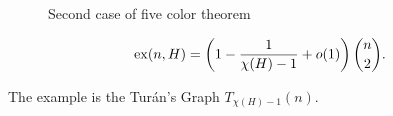 \begin{figure}[ht]
    \centering
    \caption{Second case of five color theorem}
    \label{fig:second-case-five-color-theorem}
\end{figure}

\begin{thm}
	\[
		\operatorname{ex}(n, H) = \left(1 - \frac{1}{\chi(H) - 1} + o(1)\right)\binom{n}{2}.
	\]
\end{thm}

\begin{sk}
	The example is the Turán's Graph $T_{\chi(H)-1}(n)$.


\end{sk}

